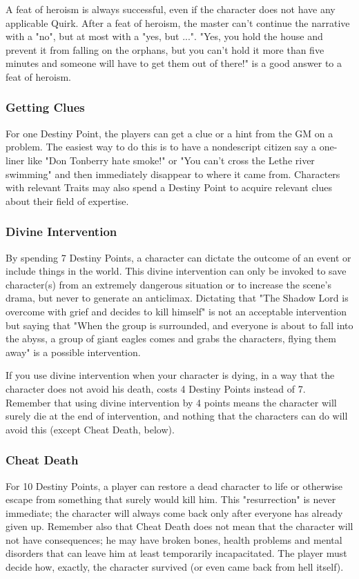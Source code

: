 A feat of heroism is always successful, even
if the character does not have any applicable Quirk.
After a feat of heroism, the master can’t continue
the narrative with a "no", but at most with a "yes,
but ...". "Yes, you hold the house and prevent it from
falling on the orphans, but you can’t hold it more
than five minutes and someone will have to get
them out of there!" is a good answer to a feat of
heroism.

\subsubsection{Getting Clues}
For one Destiny Point, the players can get a
clue or a hint from the GM on a problem. The
easiest way to do this is to have a nondescript
citizen say a one-liner like "Don Tonberry hate
smoke!" or "You can’t cross the Lethe river
swimming" and then immediately disappear to
where it came from. Characters with relevant
Traits may also spend a Destiny Point to acquire
relevant clues about their field of expertise.

\subsubsection{Divine Intervention}
By spending 7 Destiny Points, a character
can dictate the outcome of an event or include
things in the world. This divine intervention can
only be invoked to save character(s) from an
extremely dangerous situation or to increase the
scene’s drama, but never to generate an anticlimax.
Dictating that "The Shadow Lord is
overcome with grief and decides to kill himself" is
not an acceptable intervention but saying that
"When the group is surrounded, and everyone is
about to fall into the abyss, a group of giant eagles
comes and grabs the characters, flying them away"
is a possible intervention.

If you use divine intervention when your
character is dying, in a way that the character does
not avoid his death, costs 4 Destiny Points instead
of 7. Remember that using divine intervention by
4 points means the character will surely die at the
end of intervention, and nothing that the
characters can do will avoid this (except Cheat
Death, below).

\subsubsection{Cheat Death}
For 10 Destiny Points, a player can restore
a dead character to life or otherwise escape from
something that surely would kill him. This
"resurrection" is never immediate; the character
will always come back only after everyone has
already given up. Remember also that Cheat Death
does not mean that the character will not have
consequences; he may have broken bones, health
problems and mental disorders that can leave him
at least temporarily incapacitated. The player
must decide how, exactly, the character survived
(or even came back from hell itself).


